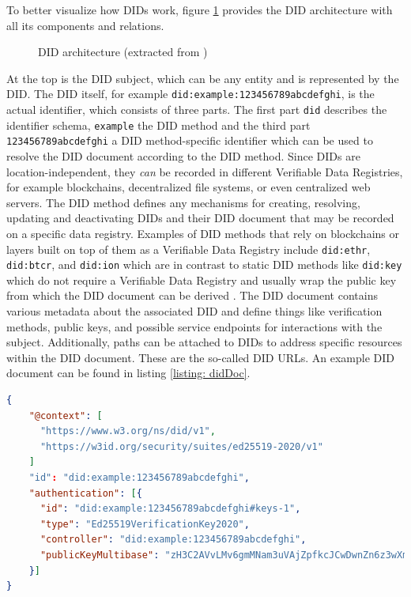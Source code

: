         To better visualize how \acp{DID} work, figure \ref{figure: didArchitecture} provides the \ac{DID} architecture with all its components and relations.
        
        \begin{figure}[ht]
    	    \centering
    	    \makebox[\textwidth]{}
            \caption[DID architecture]{\ac{DID} architecture (extracted from \cite{sporny_decentralized_2021})}
            \label{figure: didArchitecture}
        \end{figure}
        
        At the top is the \ac{DID} subject, which can be any entity and is represented by the \ac{DID}. The \ac{DID} itself, for example \texttt{did:example:123456789abcdefghi}, is the actual identifier, which consists of three parts. The first part \texttt{did} describes the identifier schema, \texttt{example} the \ac{DID} method and the third part \texttt{123456789abcdefghi} a \ac{DID} method-specific identifier which can be used to resolve the \ac{DID} document according to the \ac{DID} method. Since \acp{DID} are location-independent, they \textit{can} be recorded in different Verifiable Data Registries, for example blockchains, decentralized file systems, or even centralized web servers. The \ac{DID} method defines any mechanisms for creating, resolving, updating and deactivating \acp{DID} and their \ac{DID} document that may be recorded on a specific data registry. Examples of \ac{DID} methods that rely on blockchains or layers built on top of them as a Verifiable Data Registry include \texttt{did:ethr}, \texttt{did:btcr}, and \texttt{did:ion} which are in contrast to static \ac{DID} methods like \texttt{did:key} which do not require a Verifiable Data Registry and usually wrap the public key from which the DID document can be derived \cite[p. 171]{preukschat_self-sovereign_2021}. The \ac{DID} document contains various metadata about the associated \ac{DID} and define things like verification methods, public keys, and possible service endpoints for interactions with the subject. Additionally, paths can be attached to \acp{DID} to address specific resources within the \ac{DID} document. These are the so-called \ac{DID} URLs. An example \ac{DID} document can be found in listing \ref{listing: didDoc}. \cite{sporny_decentralized_2021}
        \newline
        
        \begin{lstlisting}[language=json, caption={[DID document example]\ac{DID} document example extracted from \cite{sporny_decentralized_2021}}, captionpos=b, label={listing: didDoc}]
{
    "@context": [
      "https://www.w3.org/ns/did/v1",
      "https://w3id.org/security/suites/ed25519-2020/v1"
    ]
    "id": "did:example:123456789abcdefghi",
    "authentication": [{
      "id": "did:example:123456789abcdefghi#keys-1",
      "type": "Ed25519VerificationKey2020",
      "controller": "did:example:123456789abcdefghi",
      "publicKeyMultibase": "zH3C2AVvLMv6gmMNam3uVAjZpfkcJCwDwnZn6z3wXmqPV"
    }]
}\end{lstlisting}
        
